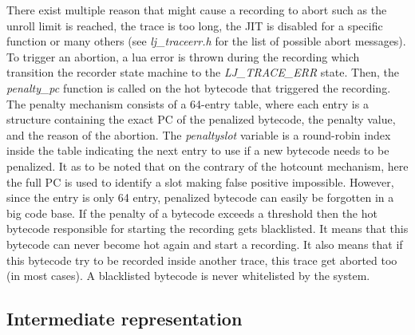 There exist multiple reason that might cause a recording to abort such as
the unroll limit is reached, the trace is too long, the
JIT is disabled for a specific function or many others (see \emph{lj\_traceerr.h}
for the list of possible abort messages). To trigger an abortion, a lua error is
thrown during the recording which transition the recorder state machine to the
\emph{LJ\_TRACE\_ERR} state. Then, the \emph{penalty\_pc} function is called on
the hot bytecode that triggered the recording. The penalty mechanism consists of
a 64-entry table, where each entry is a structure containing the exact PC of the
penalized bytecode, the penalty value, and the reason of the abortion. The
\emph{penaltyslot} variable is a round-robin index inside the table indicating
the next entry to use if a new bytecode needs to be penalized. It as to be noted
that on the contrary of the hotcount mechanism, here the full PC is used to
identify a slot making false positive impossible. However, since the entry is
only 64 entry, penalized bytecode can easily be forgotten in a big code base.
If the penalty of a bytecode exceeds a threshold then the hot bytecode
responsible for starting the recording gets blacklisted. It means that this
bytecode can never become hot again and start a recording. It also means that if this
bytecode try to be recorded inside another trace, this trace get aborted too
(in most cases). A blacklisted bytecode is never whitelisted by the system.


\subsection{Intermediate representation}
\label{Subsec:IR}

